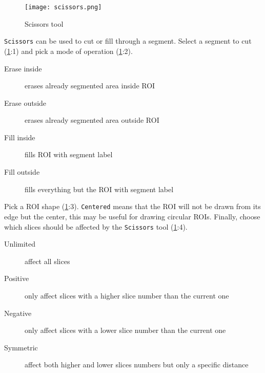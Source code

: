 \begin{figure}[h!]
	\centerline{
		\texttt{[image: scissors.png]}}
	\caption{Scissors tool}\label{fig:scissors}
\end{figure}
\noindent
\texttt{Scissors} can be used to cut or fill through a segment.
Select a segment to cut (\cref{fig:scissors}:1) and pick a mode of operation (\cref{fig:scissors}:2).
\begin{description}
	\item [Erase inside] erases already segmented area inside ROI
	\item [Erase outside] erases already segmented area outside ROI
	\item [Fill inside] fills ROI with segment label
	\item [Fill outside] fills everything but the ROI with segment label
\end{description}
Pick a ROI shape (\cref{fig:scissors}:3). \texttt{Centered} means that the ROI will not be drawn from its edge but the center, this may be useful for drawing circular ROIs.
Finally, choose which slices should be affected by the \texttt{Scissors} tool (\cref{fig:scissors}:4).
\begin{description}
	\item [Unlimited] affect all slices
	\item [Positive] only affect slices with a higher slice number than the current one
	\item [Negative] only affect slices with a lower slice number than the current one
	\item [Symmetric] affect both higher and lower slices numbers but only a specific distance
\end{description}


